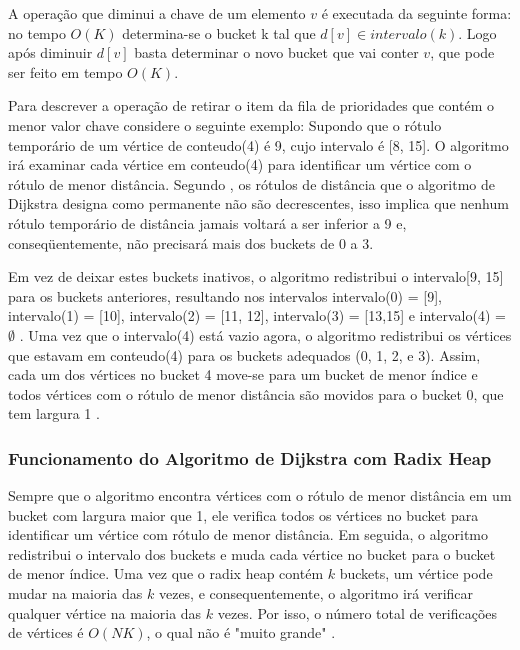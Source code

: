 A operação que diminui a chave de um elemento $v$ é executada da seguinte forma: no tempo $O(K)$ determina-se
o bucket k tal que $d[v] \in intervalo(k)$. Logo após diminuir $d[v]$ basta determinar o novo bucket que vai conter
$v$, que pode ser feito em tempo $O(K)$.

Para descrever a operação de retirar o item da fila de prioridades que contém o menor valor chave considere o seguinte exemplo:
Supondo que o rótulo temporário de um vértice de conteudo(4) é 9, cujo intervalo é [8, 15].
O algoritmo irá examinar cada vértice em conteudo(4) para identificar um vértice com o rótulo de menor distância.
Segundo \cite{bookahuja}, os rótulos de distância que o algoritmo de Dijkstra designa como permanente não são decrescentes,
isso implica que nenhum rótulo temporário de distância jamais voltará
a ser inferior a 9 e, conseqüentemente, não precisará mais dos buckets de 0 a 3.

Em vez de deixar estes buckets inativos, o algoritmo redistribui o intervalo[9, 15]
para os buckets anteriores, resultando nos intervalos intervalo(0) = [9], intervalo(1) = [10],
intervalo(2) = [11, 12], intervalo(3) = [13,15] e intervalo(4) = $\emptyset$ . Uma vez que o intervalo(4)
está vazio agora, o algoritmo redistribui os vértices que estavam em conteudo(4) para os buckets adequados (0, 1, 2, e 3).
Assim, cada um dos vértices no bucket 4 move-se para um bucket de menor índice e todos vértices com o rótulo de menor distância
são movidos para o bucket 0, que tem largura 1 \cite{bookahuja}.

\subsubsection{Funcionamento do Algoritmo de Dijkstra com Radix Heap}
Sempre que o algoritmo encontra vértices com o rótulo de menor distância em um bucket com
largura maior que 1, ele verifica todos os vértices no bucket para identificar um vértice com rótulo de menor distância.
Em seguida, o algoritmo redistribui o intervalo dos buckets e muda cada vértice no bucket para o bucket de menor índice.
Uma vez que o radix heap contém $k$ buckets, um vértice pode mudar na maioria das $k$ vezes, e consequentemente,
o algoritmo irá verificar qualquer vértice na maioria das $k$ vezes. Por isso, o número total de verificações
de vértices é $O(NK)$, o qual não é "muito grande" \cite{bookahuja}.

